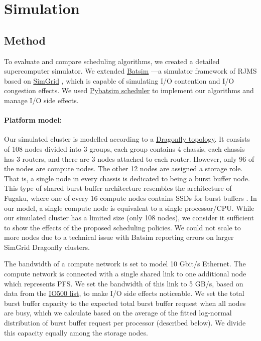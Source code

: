 \documentclass[runningheads]{llncs}
\begin{document}
\section{Simulation} \label{sec:simulation-model}
\subsection{Method}
To evaluate and compare scheduling algorithms, we created a detailed supercomputer simulator. We extended \href{https://batsim.readthedocs.io/en/latest/}{Batsim} \cite{dutot:hal-01333471,poquet:tel-01757245}---a simulator framework of RJMS based on \href{https://simgrid.org/}{SimGrid} \cite{casanova:hal-01017319}, which is capable of simulating I/O contention and I/O congestion effects. We used \href{https://gitlab.inria.fr/batsim/pybatsim}{Pybatsim scheduler} to implement our algorithms and manage I/O side effects.

\paragraph{Platform model:}
Our simulated cluster is modelled according to a \href{https://simgrid.org/doc/latest/Platform_Examples.html#dragonfly-cluster}{Dragonfly topology}. It consists of 108 nodes divided into 3 groups, each group contains 4 chassis, each chassis has 3 routers, and there are 3 nodes attached to each router. However, only 96 of the nodes are compute nodes. The other 12 nodes are assigned a storage role. That is, a single node in every chassis is dedicated to being a burst buffer node. This type of shared burst buffer architecture resembles the architecture of Fugaku, where one of every 16 compute nodes contains SSDs for burst buffers \cite{fugaku}. In our model, a single compute node is equivalent to a single processor/CPU. While our simulated cluster has a limited size (only 108 nodes), we consider it sufficient to show the effects of the proposed scheduling policies. We could not scale to more nodes due to a technical issue with Batsim reporting errors on larger SimGrid Dragonfly clusters.

The bandwidth of a compute network is set to model 10 Gbit/s Ethernet. The compute network is connected with a single shared link to one additional node which represents PFS. We set the bandwidth of this link to 5 GB/s, based on data from the \href{https://www.vi4io.org/}{IO500 list}, to make I/O side effects noticeable.
We set the total burst buffer capacity to the expected total burst buffer request when all nodes are busy, which we calculate based on the average of the fitted log-normal distribution of burst buffer request per processor (described below). We divide this capacity equally among the storage nodes.
\end{document}
